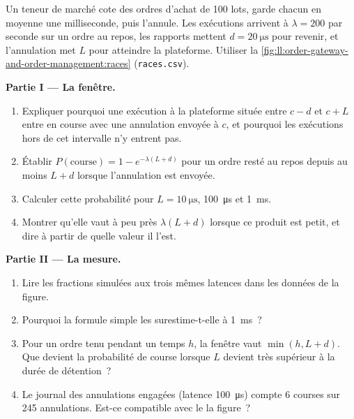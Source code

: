 \begin{problem}\label{pb:ll:order-gateway-and-order-management:1}
Un teneur de marché cote des ordres d'achat de 100 lots, garde chacun en moyenne une milliseconde, puis l'annule. Les exécutions arrivent
à $\lambda = 200$ par seconde sur un ordre au repos, les rapports mettent $d = \qty{20}{\micro\second}$ pour revenir, et l'annulation met
$L$ pour atteindre la plateforme. Utiliser la \cref{fig:ll:order-gateway-and-order-management:races} (\texttt{races.csv}).

\medskip\noindent\textbf{Partie I --- La fenêtre.}
\begin{enumerate}
\item Expliquer pourquoi une exécution à la plateforme située entre $c - d$ et $c + L$ entre en course avec une annulation envoyée à $c$, et
pourquoi les exécutions hors de cet intervalle n'y entrent pas.
\item Établir $P(\text{course}) = 1 - e^{-\lambda(L + d)}$ pour un ordre resté au repos depuis au moins $L + d$ lorsque l'annulation est envoyée.
\item Calculer cette probabilité pour $L = \qty{10}{\micro\second}$, \qty{100}{\micro\second} et \qty{1}{\milli\second}.
\item Montrer qu'elle vaut à peu près $\lambda (L + d)$ lorsque ce produit est petit, et dire à partir de quelle valeur il l'est.
\end{enumerate}

\medskip\noindent\textbf{Partie II --- La mesure.}
\begin{enumerate}[resume]
\item Lire les fractions simulées aux trois mêmes latences dans les données de la figure.
\item Pourquoi la formule simple les surestime-t-elle à \qty{1}{\milli\second}~?
\item Pour un ordre tenu pendant un temps $h$, la fenêtre vaut $\min(h, L + d)$. Que devient la probabilité de course lorsque $L$ devient
très supérieur à la durée de détention~?
\item Le journal des annulations engagées (latence \qty{100}{\micro\second}) compte 6 courses sur 245 annulations. Est-ce compatible avec le
la figure~?
\end{enumerate}


\end{problem}
